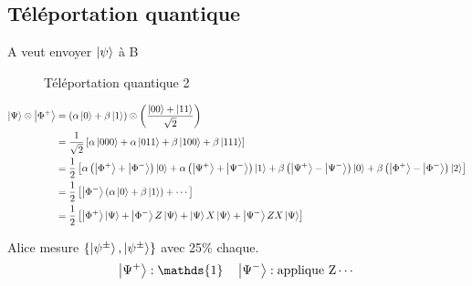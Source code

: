 



\setcounter{section}{1}
\setcounter{subsection}{5}

\subsection{Téléportation quantique}


A veut envoyer $\ket{\psi}$ à B  

\begin{figure}[ht]
    \centering
    \caption{Téléportation quantique 2}
    \label{fig:téléportation-quantique-2}
\end{figure}



\begin{align*}
	\ket{\Psi} \otimes \ket{\Phi^+} &= \left( \alpha \ket{0} + \beta \ket{1} \right) \otimes \left( \frac{\ket{00}+\ket{11}}{\sqrt{2}}  \right) \\&= \frac{1}{\sqrt{2}} \left[ \alpha \ket{000} + \alpha \ket{011} + \beta \ket{100} + \beta \ket{111} \right] \\&= \frac{1}{2} \left[ \alpha \left( \ket{\Phi^+} + \ket{\Phi^-} \right) \ket{0}+ \alpha \left( \ket{\Psi^+} + \ket{\Psi^-} \right) \ket{1} + \beta \left( \ket{\Psi^+} - \ket{\Psi^-} \right) \ket{0} + \beta \left( \ket{\Phi^+} - \ket{\Phi^-} \right) \ket{2}   \right] \\&= \frac{1}{2} \left[ \ket{\Phi^-} \left( \alpha \ket{0} + \beta \ket{1} \right) + \dotsb  \right] \\&= \frac{1}{2} \left[ \ket{\Phi^+}\ket{\Psi} + \ket{\Phi^-}Z \ket{\Psi} + \ket{\Psi}X\ket{\Psi} + \ket{\Psi^-} ZX \ket{\Psi} \right]  
\end{align*}

Alice mesure $\{ \ket{\psi^\pm}, \ket{\psi^\pm} \} $ avec 25\% chaque. $$\ket{\Psi^+}: \mathds{1}\quad \ket{\Psi^-}: \text{applique Z} \dotsb $$  



